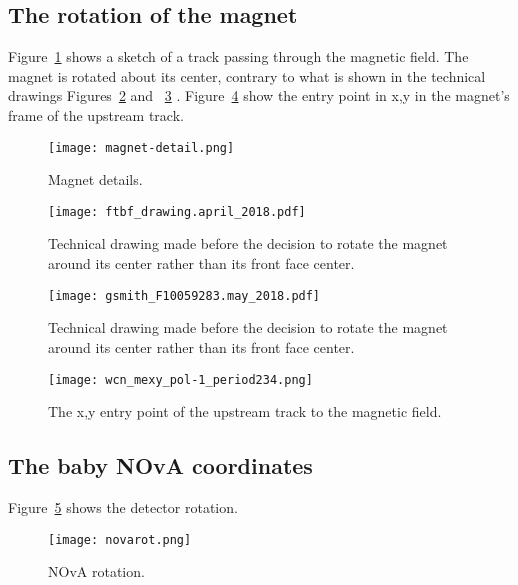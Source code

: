   
  
\newpage

\subsection{The rotation of the magnet}

Figure~\ref{fig_magnet} shows a sketch of a track passing through the magnetic field. The magnet is rotated about its center, contrary to what is shown in the technical drawings Figures~\ref{fig_td1} and ~\ref{fig_td2} . Figure~\ref{fig_xymag} show the entry point in x,y in the magnet's frame of the upstream track. 

\begin{figure}[h]	   
 \centering
        	\texttt{[image: magnet-detail.png]}	 
   \caption[short]{Magnet details.}
   \label{fig_magnet}
  \end{figure}
  
  \begin{figure}[h]	   
 \centering
        	\texttt{[image: ftbf\_drawing.april\_2018.pdf]}	 
   \caption[short]{Technical drawing made before the decision to rotate the magnet around its center rather than its front face center.}
   \label{fig_td1}
  \end{figure}
  
    \begin{figure}[h]	   
 \centering
        	\texttt{[image: gsmith\_F10059283.may\_2018.pdf]}	 
   \caption[short]{Technical drawing made before the decision to rotate the magnet around its center rather than its front face center.}
   \label{fig_td2}
  \end{figure}
  
  

       \begin{figure}[h]	   
            \centering
%   
            \texttt{[image: wcn\_mexy\_pol-1\_period234.png]}
   \caption[short]{The x,y entry point of the upstream track to the magnetic field.}
   \label{fig_xymag}
  \end{figure}
  

  
  
  

\subsection{The baby NOvA coordinates}


Figure~\ref{fig_novarot} shows the  detector rotation.

\begin{figure}[h]	   
 \centering
        	\texttt{[image: novarot.png]}	 
   \caption[short]{NOvA rotation.}
   \label{fig_novarot}
  \end{figure}
 

